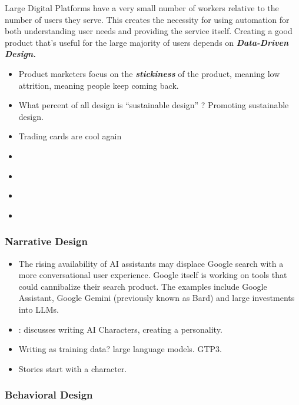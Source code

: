 \documentclass[
  letterpaper,
  DIV=11,
  numbers=noendperiod]{scrartcl}
\providecommand{\tightlist}{%
  \setlength{\itemsep}{0pt}\setlength{\parskip}{0pt}}\usepackage{longtable,booktabs,array}
\begin{document}
Large Digital Platforms have a very small number of workers relative to
the number of users they serve. This creates the necessity for using
automation for both understanding user needs and providing the service
itself. Creating a good product that's useful for the large majority of
users depends on \textbf{\emph{Data-Driven Design.}}

\begin{itemize}
\tightlist
\item
  Product marketers focus on the \textbf{\emph{stickiness}} of the
  product, meaning low attrition, meaning people keep coming back.
\item
  What percent of all design is ``sustainable design'' ? Promoting
  sustainable design.
\item
  \citet{joshluberTradingCardsAre2021} Trading cards are cool again
\item
  \citet{jesseeinhornNewBalance6502020}
\item
  \citet{connieloizosMarcyVenturePartners2021}
\item
  \citet{natashamascarenhasQueenlyMarketplaceFormalwear2021}
\item
  \citet{jeffjohnrobertsDigitalArtAwaits2020}
\end{itemize}

\subsubsection{Narrative Design}\label{narrative-design}

\begin{itemize}
\item
  The rising availability of AI assistants may displace Google search
  with a more conversational user experience. Google itself is working
  on tools that could cannibalize their search product. The examples
  include Google Assistant, Google Gemini (previously known as Bard) and
  large investments into LLMs.
\item
  \citet{aletheaaiAletheaAIAI2021}: discusses writing AI Characters,
  creating a personality.
\item
  Writing as training data? large language models. GTP3.
\item
  Stories start with a character.
\end{itemize}

\subsubsection{Behavioral Design}\label{behavioral-design}
\end{document}
